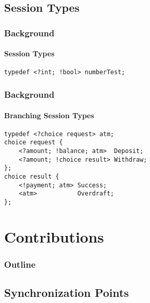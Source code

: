 \documentclass{beamer}
\begin{document}
\subsection{Session Types}
\begin{frame}[fragile]
  \frametitle{Background}
  \framesubtitle{Session Types}

\begin{lstlisting}
typedef <?int; !bool> numberTest;
\end{lstlisting}

\end{frame}

\begin{frame}[fragile]
  \frametitle{Background}
  \framesubtitle{Branching Session Types}

\begin{lstlisting}
typedef <?choice request> atm;
choice request {
    <?amount; !balance; atm>  Deposit;
    <?amount; !choice result> Withdraw;
};
choice result {
    <!payment; atm> Success;
    <atm>           Overdraft;
};
\end{lstlisting}

\end{frame}



\section{Contributions}

\begin{frame}
  \frametitle{Outline}
  \tableofcontents[currentsection]
\end{frame}

\subsection{Synchronization Points}
\end{document}
